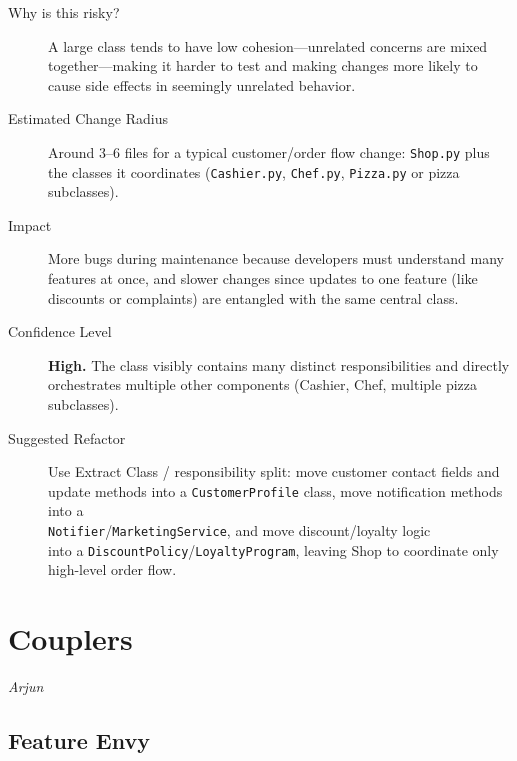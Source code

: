 \documentclass[12pt]{article}
\begin{document}
\begin{description}
    \item[Why is this risky?]
        A large class tends to have low cohesion---unrelated concerns are mixed together---making it
        harder to test and making changes more likely to cause side effects in seemingly unrelated behavior.

    \item[Estimated Change Radius]
        Around 3--6 files for a typical customer/order flow change: \texttt{Shop.py} plus the classes
        it coordinates (\texttt{Cashier.py}, \texttt{Chef.py}, \texttt{Pizza.py} or pizza subclasses).

    \item[Impact]
        More bugs during maintenance because developers must understand many features at once, and
        slower changes since updates to one feature (like discounts or complaints) are entangled
        with the same central class.

    \item[Confidence Level]
        \textbf{High.} The class visibly contains many distinct responsibilities and directly
        orchestrates multiple other components (Cashier, Chef, multiple pizza subclasses).

    \item[Suggested Refactor]
        Use Extract Class / responsibility split: move customer contact fields and update methods
        into a \texttt{CustomerProfile} class, move notification methods into a \\
        \texttt{Notifier}/\texttt{MarketingService}, and move discount/loyalty logic \\ 
        into a \texttt{DiscountPolicy}/\texttt{LoyaltyProgram}, leaving Shop to coordinate only
        high-level order flow.
\end{description}

\section{Couplers}

\textit{Arjun}

\subsection{Feature Envy}
\end{document}
